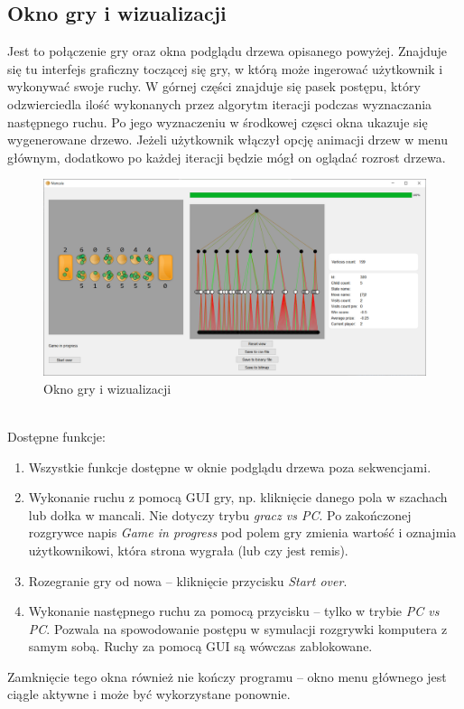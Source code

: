 \documentclass{article}
\begin{document}
\subsection{Okno gry i wizualizacji}
Jest to połączenie gry oraz okna podglądu drzewa opisanego powyżej. Znajduje się tu interfejs graficzny toczącej się gry, w którą może ingerować użytkownik i wykonywać swoje ruchy. W górnej części znajduje się pasek postępu, który odzwierciedla ilość wykonanych przez algorytm iteracji podczas wyznaczania następnego ruchu. Po jego wyznaczeniu w środkowej częsci okna ukazuje się wygenerowane drzewo. Jeżeli użytkownik włączył opcję animacji drzew w menu głównym, dodatkowo po każdej iteracji będzie mógł on oglądać rozrost drzewa.\\
\begin{figure}[h]
	\centering
	\includegraphics[width=\textwidth]{game-window}
	\caption{Okno gry i wizualizacji}
	\label{rys:gamewindow}
\end{figure}\\
Dostępne funkcje:\\
\begin{enumerate}
	\item Wszystkie funkcje dostępne w oknie podglądu drzewa poza sekwencjami.\\
	\item Wykonanie ruchu z pomocą GUI gry, np. kliknięcie danego pola w szachach lub dołka w mancali. Nie dotyczy trybu \textit{gracz vs PC}. Po zakończonej rozgrywce napis \textit{Game in progress} pod polem gry zmienia wartość i oznajmia użytkownikowi, która strona wygrała (lub czy jest remis).\\
	\item Rozegranie gry od nowa – kliknięcie przycisku \textit{Start over}.\\
	\item Wykonanie następnego ruchu za pomocą przycisku – tylko w trybie \textit{PC vs PC}. Pozwala na spowodowanie postępu w symulacji rozgrywki komputera z samym sobą. Ruchy za pomocą GUI są wówczas zablokowane.\\
\end{enumerate}
Zamknięcie tego okna również nie kończy programu – okno menu głównego jest ciągle aktywne i może być wykorzystane ponownie.
\end{document}
